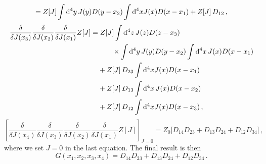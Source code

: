 \begin{sol}
\begin{equation}
        = Z[J] \int {\rm d}^{4}y \, J(y)D(y-x_{2}) \int {\rm d}^{4}x J(x)D(x-x_1) + Z[J] \, D_{12} \, ,
    \end{equation}
    \begin{equation}
    \begin{split}
        \frac{\delta}{\delta J(x_{3})}\frac{\delta}{\delta J(x_{2})}\frac{\delta}{\delta J(x_{1})}Z[J] 
        = &\; Z[J] \int {\rm d}^{4}z \, J(z)D(z-x_3) \\
        & \qquad \times \int {\rm d}^{4}y \, J(y)D(y-x_2)\int {\rm d}^{4}x \, J(x)D(x-x_1) \\
        & + Z[J] \, D_{23} \int {\rm d}^{4}x J(x)D(x-x_{1}) \\
        & + Z[J] \, D_{13} \int {\rm d}^{4}x \, J(x)D(x - x_2) \\
        & + Z[J]\, D_{12} \int {\rm d}^{4}x J(x) D(x-x_3) \, ,
    \end{split}
    \end{equation}
    \begin{equation}
        \left[\frac{\delta}{\delta J(x_{4})}\frac{\delta}{\delta J(x_{3})}\frac{\delta}{\delta J(x_{2})}\frac{\delta}{\delta J(x_{1})}Z[J]\right]_{J=0} 
        = Z_0 \Big[D_{14} D_{23} + D_{13} D_{24} + D_{12} D_{34}\Big] \, ,
    \end{equation}
    where we set $J=0$ in the last equation. The final result is then
    \begin{equation}
          G(x_1, x_2, x_3, x_4) = D_{14} D_{23} + D_{13} D_{24} + D_{12} D_{34} \, .
    \end{equation}
\end{sol}